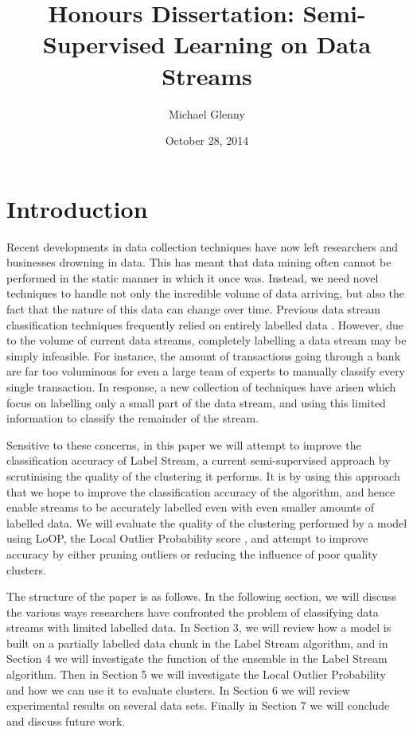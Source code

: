 \documentclass[12pt,a4paper,oneside]{report}
\begin{document}
\title{Honours Dissertation: Semi-Supervised Learning on Data Streams}
\author{Michael Glenny}
\date{October 28, 2014}
\maketitle

\section*{Introduction}

Recent developments in data collection techniques have now left researchers and businesses drowning in data. This has meant that data mining often cannot be performed in the static manner in which it once was. Instead, we need novel techniques to handle not only the incredible volume of data arriving, but also the fact that the nature of this data can change over time. Previous data stream classification techniques frequently relied on entirely labelled data \cite{Incremental, Ens}. However, due to the volume of current data streams, completely labelling a data stream may be simply infeasible. For instance, the amount of transactions going through a bank are far too voluminous for even a large team of experts to manually classify every single transaction. In response, a new collection of techniques have arisen which focus on labelling only a small part of the data stream, and using this limited information to classify the remainder of the stream\cite{LabStr,Zhang}. 

Sensitive to these concerns, in this paper we will attempt to improve the classification accuracy of  Label Stream, a current semi-supervised approach by scrutinising the quality of the clustering it performs. It is by using this approach that we hope to improve the classification accuracy of the algorithm, and hence enable streams to be accurately labelled even with even smaller amounts of labelled data. We will evaluate the quality of the clustering performed by a model using LoOP, the Local Outlier Probability score \cite{Loop}, and attempt to improve accuracy by either pruning outliers or reducing the influence of poor quality clusters. 

The structure of the paper is as follows. In the following section, we will discuss the various ways researchers have confronted the problem of classifying data streams with limited labelled data. In Section 3, we will review how a model is built on a partially labelled data chunk in the Label Stream algorithm, and in Section 4 we will investigate the function of the ensemble in the Label Stream algorithm. Then in Section 5 we will investigate the Local Outlier Probability and how we can use it to evaluate clusters. In Section 6 we will review experimental results on several data sets. Finally in Section 7 we will conclude and discuss future work. 
\end{document}
